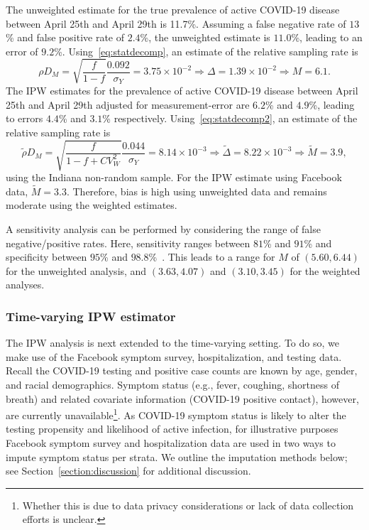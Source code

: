 \documentclass[11pt]{amsart}
\numberwithin{equation}{section}
\theoremstyle{plain}
\begin{document}
 The unweighted estimate for the true prevalence of active COVID-19 disease between April 25th and April 29th is 11.7\%.  Assuming a false negative rate of $13$\% and false positive rate of $2.4$\%, the unweighted estimate is $11.0$\%, leading to an error of $9.2$\%.  Using~\eqref{eq:statdecomp}, an estimate of the relative sampling rate is
 \begin{equation*}
 \rho D_M = \sqrt{\frac{f}{1-f}} \frac{\text{0.092}}{\sigma_Y} = 3.75 \times 10^{-2} \Rightarrow \Delta = 1.39 \times 10^{-2} \Rightarrow M = 6.1.
 \end{equation*}
 The IPW estimates for the prevalence of active COVID-19 disease between April 25th and April 29th adjusted for measurement-error are $6.2$\% and $4.9$\%, leading to errors $4.4$\% and $3.1$\% respectively.  Using~\eqref{eq:statdecomp2}, an estimate of the relative sampling rate is
 \begin{equation*}
 \tilde \rho D_M = \sqrt{\frac{f}{1-f+CV_W^2}} \frac{\text{0.044}}{\sigma_Y} = 8.14 \times 10^{-3} \Rightarrow \tilde \Delta = 8.22 \times 10^{-3}  \Rightarrow \tilde M = 3.9,
 \end{equation*}
 using the Indiana non-random sample.  For the IPW estimate using Facebook data, $\tilde M = 3.3$. Therefore, bias is high using unweighted data and remains moderate using the weighted estimates.

 A sensitivity analysis can be performed by considering the range of false negative/positive rates.  Here, sensitivity ranges between $81$\% and $91$\% and specificity between $95$\% and $98.8$\%~\cite{Katz2020}. This leads to a range for $M$ of $(5.60, 6.44)$ for the unweighted analysis, and $(3.63,4.07)$ and $(3.10, 3.45)$ for the weighted analyses.

 \subsubsection{Time-varying IPW estimator}
 \label{section:tvipw}

 The IPW analysis is next extended to the time-varying setting.  To do so, we make use of the Facebook symptom survey, hospitalization, and testing data.  Recall the COVID-19 testing and positive case counts are known by age, gender, and racial demographics. Symptom status (e.g., fever, coughing, shortness of breath) and related covariate information (COVID-19 positive contact), however, are currently unavailable\footnote{Whether this is due to data privacy considerations or lack of data collection efforts is unclear.}.  As COVID-19 symptom status is likely to alter the testing propensity and likelihood of active infection, for illustrative purposes Facebook symptom survey and hospitalization data are used in two ways to impute symptom status per strata. We outline the imputation methods below; see Section~\ref{section:discussion} for additional discussion.
\end{document}
